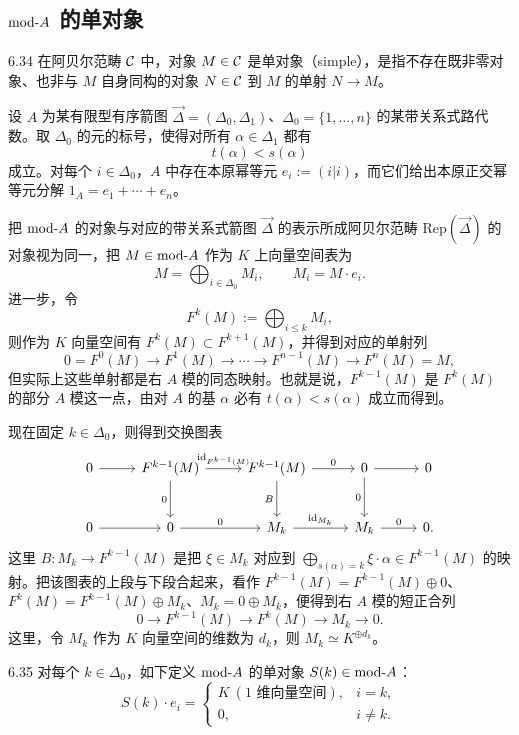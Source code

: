 \subsection{$\mathrm{mod}\text{-}A$ 的单对象}

\begin{definition}{6.34}
在阿贝尔范畴 $\mathcal{C}$ 中，对象 $M\in\mathcal{C}$ 是单对象（simple），是指不存在既非零对象、也非与 $M$ 自身同构的对象 $N\in\mathcal{C}$ 到 $M$ 的单射 $N\to M$。
\end{definition}

设 $A$ 为某有限型有序箭图 $\vec{\Delta}=(\Delta_0,\Delta_1)$、$\Delta_0=\{1,\dots,n\}$ 的某带关系式路代数。取 $\Delta_0$ 的元的标号，使得对所有 $\alpha\in\Delta_1$ 都有
\[
t(\alpha)<s(\alpha)
\]
成立。对每个 $i\in\Delta_0$，$A$ 中存在本原幂等元 $e_i:=(i|i)$，而它们给出本原正交幂等元分解 $1_A=e_1+\cdots+e_n$。

把 $\mathrm{mod}\text{-}A$ 的对象与对应的带关系式箭图 $\vec{\Delta}$ 的表示所成阿贝尔范畴 $\mathrm{Rep}(\vec{\Delta})$ 的对象视为同一，把 $M\in\mathrm{mod}\text{-}A$ 作为 $K$ 上向量空间表为
\[
M=\bigoplus_{i\in\Delta_0}M_i,\qquad M_i=M\cdot e_i.
\]
进一步，令
\[
F^{k}(M):=\bigoplus_{i\le k}M_i,
\]
则作为 $K$ 向量空间有 $F^{k}(M)\subset F^{k+1}(M)$，并得到对应的单射列
\[
0=F^{0}(M)\to F^{1}(M)\to\cdots\to F^{n-1}(M)\to F^{n}(M)=M,
\]
但实际上这些单射都是右 $A$ 模的同态映射。也就是说，$F^{k-1}(M)$ 是 $F^{k}(M)$ 的部分 $A$ 模这一点，由对 $A$ 的基 $\alpha$ 必有 $t(\alpha)<s(\alpha)$ 成立而得到。

现在固定 $k\in\Delta_0$，则得到交换图表
\[\begin{tikzcd}[row sep=2.6em, column sep=2.6em]
  0 \arrow[r] & F^{k-1}(M) \arrow[r,"\id_{F^{k-1}(M)}"] \arrow[d,"0"'] & F^{k-1}(M) \arrow[r,"0"] \arrow[d,"B"'] & 0 \arrow[r] \arrow[d,"0"'] & 0 \\
  0 \arrow[r] & 0 \arrow[r,"0"] & M_k \arrow[r,"\id_{M_k}"] & M_k \arrow[r,"0"] & 0 .
\end{tikzcd}\]
这里 $B\colon M_k\to F^{k-1}(M)$ 是把 $\xi\in M_k$ 对应到 $\bigoplus_{s(\alpha)=k}\xi\cdot\alpha\in F^{k-1}(M)$ 的映射。把该图表的上段与下段合起来，看作 $F^{k-1}(M)=F^{k-1}(M)\oplus 0$、$F^{k}(M)=F^{k-1}(M)\oplus M_k$、$M_k=0\oplus M_k$，便得到右 $A$ 模的短正合列
\begin{equation}
0\to F^{k-1}(M)\to F^{k}(M)\to M_k\to 0. \tag{6.3}
\end{equation}
这里，令 $M_k$ 作为 $K$ 向量空间的维数为 $d_k$，则 $M_k\simeq K^{\oplus d_k}$。

\begin{definition}{6.35}
对每个 $k\in\Delta_0$，如下定义 $\mathrm{mod}\text{-}A$ 的单对象 $S(k)\in\mathrm{mod}\text{-}A$：
\[
S(k)\cdot e_i=
\begin{cases}
K\ (\text{$1$ 维向量空间}), & i=k,\\
0, & i\neq k.
\end{cases}
\]
\end{definition}

